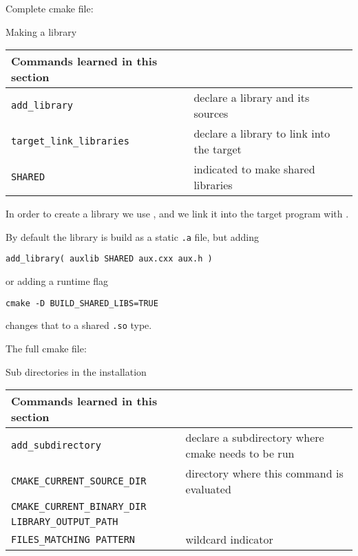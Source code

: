Complete cmake file:
%


\newpage
{} {Making a library}

\begin{tabular}{lp{3in}}
  \toprule
  Commands learned in this section\\
  \midrule
  \lstinline+add_library+&declare a library and its sources\\
  \lstinline+target_link_libraries+&declare a library to link into the target\\
  \lstinline+SHARED+&indicated to make shared libraries\\
  \bottomrule
\end{tabular}

\begin{floatingfigure}[r]{2.5in}
  \begin{minipage}{2.5in}
  \end{minipage}
\end{floatingfigure}
%
In order to create a library we use ,
and we link it into the target program with .

By default the library is build as a static \texttt{.a} file,
but adding
\begin{lstlisting}
add_library( auxlib SHARED aux.cxx aux.h )
\end{lstlisting}
or adding a runtime flag
\begin{verbatim}
cmake -D BUILD_SHARED_LIBS=TRUE
\end{verbatim}
changes that to a shared \texttt{.so} type.

The full cmake file:
%


\newpage
{} {Sub directories in the installation}
\label{sec:cmake-install-dirs}
\label{sec:cmake-rpath}

\begin{tabular}{lp{3in}}
  \toprule
  Commands learned in this section\\
  \midrule
  \lstinline+add_subdirectory+&declare a subdirectory where cmake needs to be run\\
  \lstinline+CMAKE_CURRENT_SOURCE_DIR+&directory where this command is evaluated\\
  \lstinline+CMAKE_CURRENT_BINARY_DIR+&\\
  \lstinline+LIBRARY_OUTPUT_PATH+&\\
  \lstinline+FILES_MATCHING PATTERN+&wildcard indicator\\
  \bottomrule
\end{tabular}

